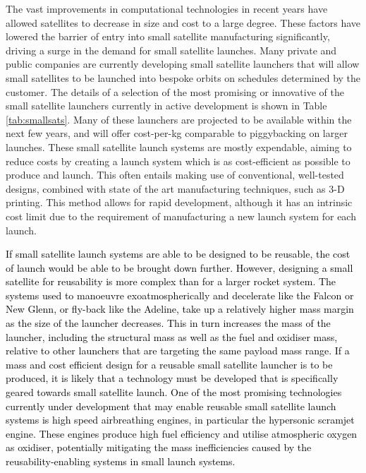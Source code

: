    
    The vast improvements in computational technologies in recent years have allowed satellites to decrease in size and cost to a large degree. These factors have lowered the barrier of entry into small satellite manufacturing significantly, driving a surge in the demand for small satellite launches. Many private and public companies are currently developing small satellite launchers that will allow small satellites to be launched into bespoke orbits on schedules determined by the customer\cite{Faa2018}. The details of a selection of the most promising or innovative of the small satellite launchers currently in active development is shown in Table \ref{tab:smallsats}. Many of these launchers are projected to be available within the next few years, and will offer cost-per-kg comparable to piggybacking on larger launches.
    These small satellite launch systems are mostly expendable, aiming to reduce costs by creating a launch system which is as cost-efficient as possible to produce and launch\cite{Niederstrasser2015}. This often entails making use of conventional, well-tested designs, combined with state of the art manufacturing techniques, such as 3-D printing\cite{Niederstrasser2015,Gilmour}. This method allows for rapid development, although it has an intrinsic cost limit due to the requirement of manufacturing a new launch system for each launch. 
    
    \textcolor{black}{If small satellite launch systems are able to be designed to be reusable, the cost of launch would be able to be brought down further. However, designing a small satellite for reusability is more complex than for a larger rocket system. The systems used to manoeuvre exoatmospherically and decelerate like the Falcon or New Glenn, or fly-back like the Adeline, take up a relatively higher mass margin as the size of the launcher decreases. This in turn increases the mass of the launcher, including the structural mass as well as the fuel and oxidiser mass, relative to other launchers that are targeting the same payload mass range. If a mass and cost efficient design for a reusable small satellite launcher is to be produced, it is likely that a technology must be developed that is specifically geared towards small satellite launch. 
    One of the most promising technologies currently under development that may enable reusable small satellite launch systems is high speed airbreathing engines\cite{Smart2009}, in particular the hypersonic scramjet engine. These engines produce high fuel efficiency and utilise atmospheric oxygen as oxidiser, potentially mitigating the mass inefficiencies caused by the reusability-enabling systems in small launch systems.}
    

